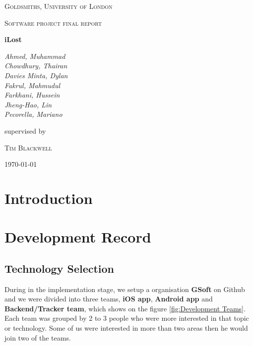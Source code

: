 \documentclass[12pt,a4paper]{article}
\begin{document}
    \begin{titlepage}
      \centering
      {\scshape\LARGE Goldsmiths, University of London \par}
      \vspace{1cm}
      {\scshape\Large Software project final report\par}
      \vspace{1.5cm}
      {\huge\bfseries iLost\par}
      \vspace{2cm}
      {\Large\itshape 
        Ahmed, Muhammad\\
        Chowdhury, Thairan\\
        Davies Minta, Dylan\\     
        Fakrul, Mahmudul\\    
        Farkhani, Hussein\\ 
        Jheng-Hao, Lin\\
        Pecorella, Mariano\\ \par}
      \vfill
      supervised by\par
      \textsc{Tim Blackwell} 
      \vfill
      {\large \today \par}
    \end{titlepage}

    \tableofcontents
    \newpage

    \section{Introduction}
    \section{Development Record}
      \subsection{Technology Selection} 
        During in the implementation stage, we setup a organisation {\bf GSoft} on Github and we were divided into three teams, {\bf iOS app}, {\bf Android app} and {\bf Backend/Tracker team}, which shows on the figure \ref{fig:Development Teams}. Each team was grouped by 2 to 3 people who were more interested in that topic or technology. Some of us were interested in more than two areas then he would join two of the teams. 
\end{document}
